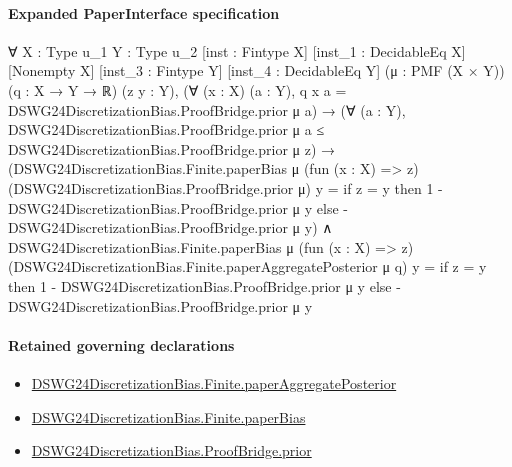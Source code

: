\documentclass[10pt]{article}
\begin{document}
\paragraph{Expanded PaperInterface specification}
\begin{ReviewVerbatim}
∀ {X : Type u_1} {Y : Type u_2} [inst : Fintype X] [inst_1 : DecidableEq X] [Nonempty X] [inst_3 : Fintype Y]
  [inst_4 : DecidableEq Y] (μ : PMF (X × Y)) (q : X → Y → ℝ) (z y : Y),
  (∀ (x : X) (a : Y), q x a = DSWG24DiscretizationBias.ProofBridge.prior μ a) →
    (∀ (a : Y), DSWG24DiscretizationBias.ProofBridge.prior μ a ≤ DSWG24DiscretizationBias.ProofBridge.prior μ z) →
      (DSWG24DiscretizationBias.Finite.paperBias μ (fun (x : X) => z) (DSWG24DiscretizationBias.ProofBridge.prior μ) y =
          if z = y then 1 - DSWG24DiscretizationBias.ProofBridge.prior μ y
          else -DSWG24DiscretizationBias.ProofBridge.prior μ y) ∧
        DSWG24DiscretizationBias.Finite.paperBias μ (fun (x : X) => z)
            (DSWG24DiscretizationBias.Finite.paperAggregatePosterior μ q) y =
          if z = y then 1 - DSWG24DiscretizationBias.ProofBridge.prior μ y
          else -DSWG24DiscretizationBias.ProofBridge.prior μ y
\end{ReviewVerbatim}

\paragraph{Retained governing declarations}
\begin{itemize}\raggedright
\item \hyperlink{governing-declaration-7bdd5ebec3f67e16}{DSWG24\allowbreak{}Discretization\allowbreak{}Bias.\allowbreak{}Finite.\allowbreak{}paper\allowbreak{}Aggregate\allowbreak{}Posterior}
\item \hyperlink{governing-declaration-5d2200dbd9b4b93d}{DSWG24\allowbreak{}Discretization\allowbreak{}Bias.\allowbreak{}Finite.\allowbreak{}paper\allowbreak{}Bias}
\item \hyperlink{governing-declaration-8260e4a6984dc105}{DSWG24\allowbreak{}Discretization\allowbreak{}Bias.\allowbreak{}Proof\allowbreak{}Bridge.\allowbreak{}prior}
\end{itemize}
\end{document}
